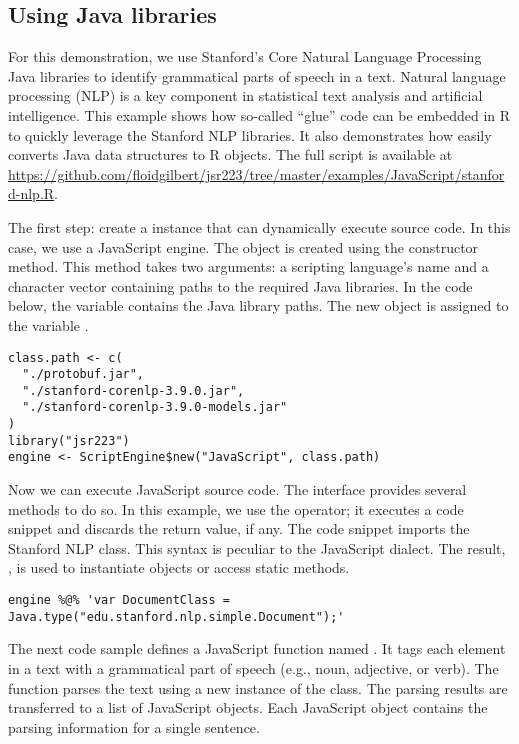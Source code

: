 \subsection{Using Java libraries}

For this demonstration, we use Stanford's Core Natural Language Processing Java libraries \citep{stanfordcorenlp} to identify grammatical parts of speech in a text. Natural language processing (NLP) is a key component in statistical text analysis and artificial intelligence. This example shows how so-called ``glue'' code can be embedded in R to quickly leverage the Stanford NLP libraries. It also demonstrates how easily  converts Java data structures to R objects. The full script is available at \url{https://github.com/floidgilbert/jsr223/tree/master/examples/JavaScript/stanford-nlp.R}.

The first step: create a   instance that can dynamically execute source code. In this case, we use a JavaScript engine. The object is created using the  constructor method. This method takes two arguments: a scripting language's name and a character vector containing paths to the required Java libraries. In the code below, the  variable contains the Java library paths. The new  object is assigned to the variable .

\begin{verbatim}
class.path <- c(
  "./protobuf.jar",
  "./stanford-corenlp-3.9.0.jar",
  "./stanford-corenlp-3.9.0-models.jar"
)
library("jsr223")
engine <- ScriptEngine$new("JavaScript", class.path)
\end{verbatim}
Now we can execute JavaScript source code. The  interface provides several methods to do so. In this example, we use the  operator; it executes a code snippet and discards the return value, if any. The code snippet imports the Stanford NLP  class. This syntax is peculiar to the JavaScript dialect. The result, , is used to instantiate objects or access static methods.

\begin{verbatim}
engine %@% 'var DocumentClass = Java.type("edu.stanford.nlp.simple.Document");'
\end{verbatim}
The next code sample defines a JavaScript function named . It tags each element in a text with a grammatical part of speech (e.g., noun, adjective, or verb). The function parses the text using a new instance of the  class. The parsing results are transferred to a list of JavaScript objects. Each JavaScript object contains the parsing information for a single sentence.

